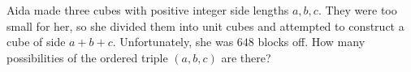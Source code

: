 Aida made three cubes with positive integer side lengths $a,b,c$. They were too small for her, so she divided them into unit cubes and attempted to construct a cube of side $a+b+c$. Unfortunately, she was $648$ blocks off. How many possibilities of the ordered triple $\left(a,b,c\right)$ are there?